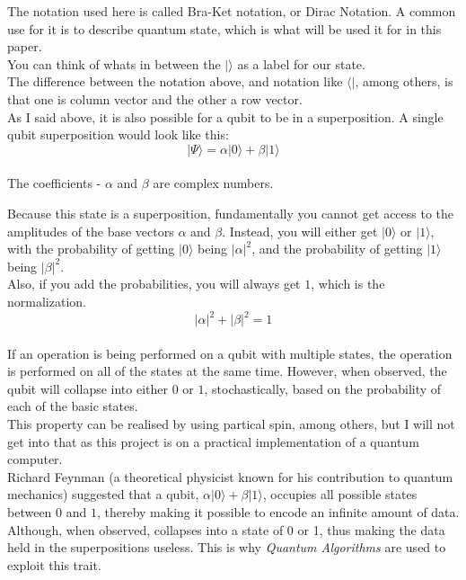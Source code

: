 \documentclass{report}
\begin{document}
The notation used here is called Bra-Ket notation, or Dirac Notation. A
common use for it is to describe quantum state, which is what will be
used it for in this paper.\\
You can think of whats in between the \(\lvert\rangle\) as a label for our
state.\\
The difference between the notation above, and notation like
\(\langle\lvert\), among others, is that one is column vector and the other a
row vector.\\
As I said above, it is also possible for a qubit to be in a
superposition. A single qubit superposition would look like this:\\
\[
\left\lvert \Psi \rangle =\alpha\lvert0\rangle +\beta\right\lvert 1\rangle\]\\
The coefficients - \(\alpha\) and \(\beta\) are complex numbers.

Because this state is a superposition, fundamentally you cannot get
access to the amplitudes of the base vectors \(\alpha\) and \(\beta\).
Instead, you will either get \(\lvert0\rangle\) or \(\lvert1\rangle\), with the
probability of getting \(\lvert0\rangle\) being \(\lvert\alpha\lvert^2\), and the
probability of getting \(\lvert1\rangle\) being \(\lvert\beta\lvert^2\).\\
Also, if you add the probabilities, you will always get \(1\), which is
the normalization.\\
\[
\lvert\alpha\lvert^2 + \lvert\beta\lvert^2 = 1\]\\
If an operation is being performed on a qubit with multiple states, the
operation is performed on all of the states at the same time. However,
when observed, the qubit will collapse into either \(0\) or \(1\),
stochastically, based on the probability of each of the basic states.\\
This property can be realised by using partical spin, among others, but
I will not get into that as this project is on a practical
implementation of a quantum computer.\\
Richard Feynman (a theoretical physicist known for his contribution to
quantum mechanics) suggested that a qubit,
\(\alpha\lvert0\rangle + \beta\lvert1\rangle\), occupies all possible states
between \(0\) and \(1\), thereby making it possible to encode an
infinite amount of data. Although, when observed, collapses into a state
of 0 or 1, thus making the data held in the superpositions useless. This
is why \emph{Quantum Algorithms} are used to exploit this trait.
\end{document}

